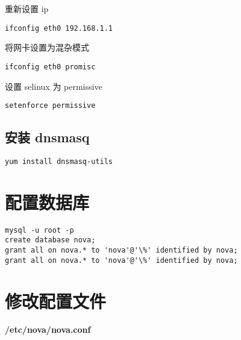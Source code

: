 \documentclass[a4paper,12pt,english]{sphinxmanual}
\begin{document}
重新设置 ip

\begin{Verbatim}[commandchars=\\\{\}]
ifconfig eth0 192.168.1.1
\end{Verbatim}

将网卡设置为混杂模式

\begin{Verbatim}[commandchars=\\\{\}]
ifconfig eth0 promisc
\end{Verbatim}

设置 selinux 为 permissive

\begin{Verbatim}[commandchars=\\\{\}]
setenforce permissive
\end{Verbatim}


\subsection{安装 dnsmasq}
\label{nova:dnsmasq}
\begin{Verbatim}[commandchars=\\\{\}]
yum install dnsmasq-utils
\end{Verbatim}


\section{配置数据库}
\label{nova:id3}
\begin{Verbatim}[commandchars=\\\{\}]
mysql -u root -p
create database nova;
grant all on nova.* to 'nova'@'\%' identified by nova;
grant all on nova.* to 'nova'@'\%' identified by nova;
\end{Verbatim}


\section{修改配置文件}
\label{nova:id4}
\textbf{/etc/nova/nova.conf}
\end{document}
